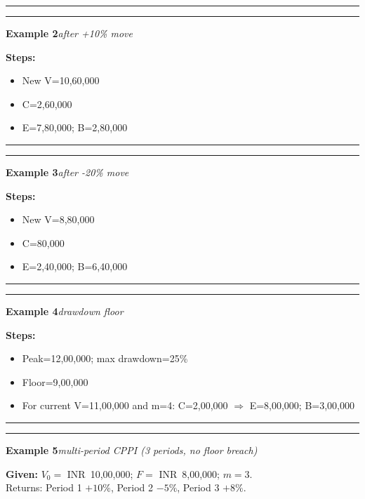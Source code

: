 \documentclass[
]{article}
\begin{document}
\noindent\rule{\linewidth}{0.4pt}
\medskip
\noindent\rule{\linewidth}{0.4pt}
\noindent\textbf{Example 2}\enspace\textit{after +10\% move}

\noindent\textbf{Steps:}
\begin{itemize}\setlength{\itemsep}{3pt}
  \item New V=10,60,000
  \item C=2,60,000
  \item E=7,80,000; B=2,80,000
\end{itemize}

\noindent\rule{\linewidth}{0.4pt}
\medskip
\noindent\rule{\linewidth}{0.4pt}
\noindent\textbf{Example 3}\enspace\textit{after -20\% move}

\noindent\textbf{Steps:}
\begin{itemize}\setlength{\itemsep}{3pt}
  \item New V=8,80,000
  \item C=80,000
  \item E=2,40,000; B=6,40,000
\end{itemize}

\noindent\rule{\linewidth}{0.4pt}
\medskip
\noindent\rule{\linewidth}{0.4pt}
\noindent\textbf{Example 4}\enspace\textit{drawdown floor}

\noindent\textbf{Steps:}
\begin{itemize}\setlength{\itemsep}{3pt}
  \item Peak=12,00,000; max drawdown=25\%
  \item Floor=9,00,000
  \item For current V=11,00,000 and m=4: C=2,00,000 $\Rightarrow$ E=8,00,000; B=3,00,000
\end{itemize}

\noindent\rule{\linewidth}{0.4pt}
\medskip
\noindent\rule{\linewidth}{0.4pt}
\noindent\textbf{Example 5}\enspace\textit{multi-period CPPI (3 periods, no floor breach)}

\noindent\textbf{Given:} $V_0=$ INR~10{,}00{,}000; $F=$ INR~8{,}00{,}000; $m=3$.\\
Returns: Period 1 $+10\%$, Period 2 $-5\%$, Period 3 $+8\%$.
\end{document}
